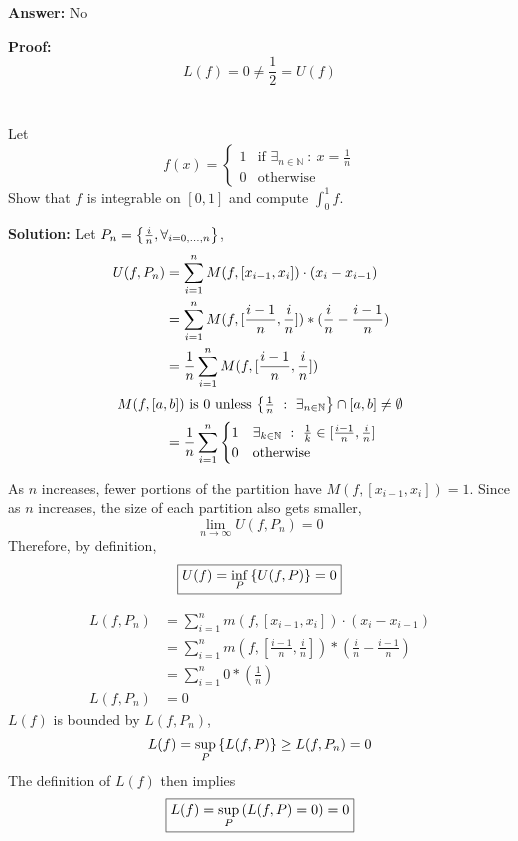 \documentclass[]{article}
\newcommand{\N}{\mathbb{N}}
\newcommand{\st}{\ : \ }
\begin{document}
\textbf{Answer:}
No

\textbf{Proof:}
\[
    L(f) = 0 \neq \frac{1}{2} = U(f)
\]

\newpage
\section{}
Let \[
    f(x) = \begin{cases}
        1 & \text{if $\exists_{n \in \N} \st x = \frac{1}{n}$}\\
        0 & \text{otherwise}
    \end{cases}
\]
Show that $f$ is integrable on $[0,1]$ and compute $\int_{0}^{1} f$.

\textbf{Solution:}
Let $P_n = \qty{\frac{i}{n}, \forall_{i = 0,\dots,n}}$,
\begin{align*}
    U(f,P_n) &= \sum_{i=1}^{n} M(f,[x_{i-1},x_i]) \cdot (x_i - x_{i-1})\\
        &= \sum_{i=1}^{n} M(f, [\frac{i-1}{n}, \frac{i}{n}]) * (\frac{i}{n} - \frac{i-1}{n})\\
        &= \frac{1}{n}\sum_{i=1}^{n} M(f, [\frac{i-1}{n}, \frac{i}{n}])\\
    \intertext{
        $M(f, [a,b])$ is 0 unless $\qty{\frac{1}{n} \st \exists_{n \in \N}} \cap [a,b] \neq \emptyset$
    }
        &= \frac{1}{n}\sum_{i=1}^{n} \begin{cases}
                1 & \exists_{k \in \N} \st \frac{1}{k} \in [\frac{i-1}{n}, \frac{i}{n}]\\
                0 & \text{otherwise}
            \end{cases}
\end{align*}

As $n$ increases, fewer portions of the partition have $M(f,[x_{i-1},x_{i}]) = 1$.
Since as $n$ increases, the size of each partition also gets smaller,\[
    \lim_{n\to\infty} U(f,P_n) = 0
\]
Therefore, by definition, \[
    \boxed{U(f) = \inf_{P} \qty{U(f,P)} = 0}
\]

\begin{align*}
    L(f,P_n) &= \sum_{i=1}^{n} m(f,[x_{i-1},x_i]) \cdot (x_i - x_{i-1})\\
        &= \sum_{i=1}^{n} m(f, [\frac{i-1}{n}, \frac{i}{n}]) * (\frac{i}{n} - \frac{i-1}{n})\\
        &= \sum_{i=1}^{n} 0 * (\frac{1}{n})\\
    L(f,P_n) &= 0
\end{align*}
$L(f)$ is bounded by $L(f,P_n)$,\[
    L(f) = \sup_{P} \qty{L(f,P)} \geq L(f,P_n) = 0
\]
The definition of $L(f)$ then implies\[
    \boxed{L(f) = \sup_{P} \qty(L(f,P) = 0) = 0}
\]
\end{document}
